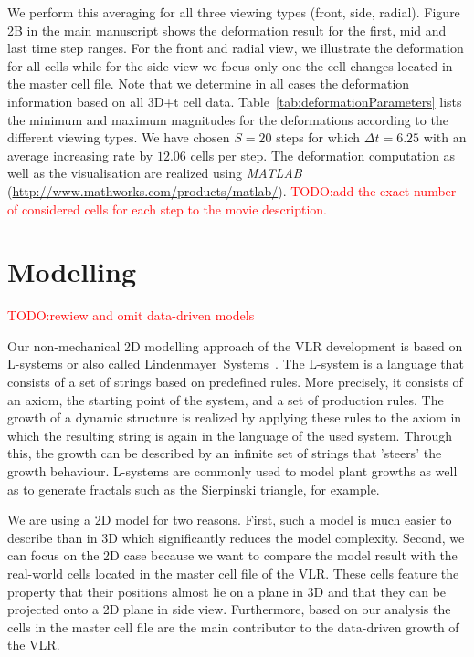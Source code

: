 \documentclass[11pt,a4paper, final]{article}
\newcommand{\TODO}[1]{
\textcolor{red}{TODO:#1}
}
\begin{document}
We perform this averaging for all three viewing types (front, side, radial). Figure 2B in the main manuscript shows the deformation result for the first, mid and last time step ranges. For the front and radial view, we illustrate the deformation for all cells while for the side view we focus only one the cell changes located in the master cell file. Note that we determine in all cases the deformation information based on all 3D+t cell data. Table~\ref{tab:deformationParameters} lists the minimum and maximum magnitudes for the deformations according to the different viewing types. We have chosen $S=20$ steps for which $\Delta t = 6.25$ with an average increasing rate by $12.06$ cells per step. The deformation computation as well as the visualisation are realized using \textit{MATLAB} (\href{http://www.mathworks.com/products/matlab/}{http://www.mathworks.com/products/matlab/}). \TODO{add the exact number of considered cells for each step to the movie description.}

\clearpage
\section{Modelling}
\noindent
\TODO{rewiew and omit data-driven models}
Our non-mechanical 2D modelling approach of the VLR development is based on L-systems or also called Lindenmayer~Systems~\cite{lindenmayer_1968, prusinkiewicz_lindenmayer_1990}. The L-system is a language that consists of a set of strings based on predefined rules. More precisely, it consists of an axiom, the starting point of the system, and a set of production rules. The growth of a dynamic structure is realized by applying these rules to the axiom in which the resulting string is again in the language of the used system. Through this, the growth can be described by an infinite set of strings that 'steers' the growth behaviour. L-systems are commonly used to model plant growths as well as to generate fractals such as the Sierpinski triangle, for example.

We are using a 2D model for two reasons. First, such a model is much easier to describe than in 3D which significantly reduces the model complexity. Second, we can focus on the 2D case because we want to compare the model result with the real-world cells located in the master cell file of the VLR. These cells feature the property that their positions almost lie on a plane in 3D and that they can be projected onto a 2D plane in side view. Furthermore, based on our analysis the cells in the master cell file are the main contributor to the data-driven growth of the VLR.
\end{document}
